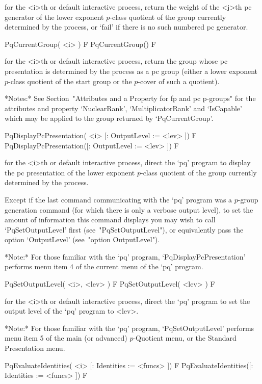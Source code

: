 for the <i>th or default interactive {\ANUPQ} process, return the  weight
of the <j>th pc generator of the lower exponent $p$-class quotient of the
group currently determined by the process, or `fail' if there is no  such
numbered pc generator.

\>PqCurrentGroup( <i> ) F
\>PqCurrentGroup() F

for the <i>th or default interactive {\ANUPQ} process, return  the  group
whose pc presentation is determined by the process as a {\GAP}  pc  group
(either a lower exponent $p$-class quotient of the  start  group  or  the
$p$-cover of such a quotient).

*Notes:*
See Section~"Attributes and a Property for fp and pc  p-groups"  for  the
attributes   and   property   `NuclearRank',   `MultiplicatorRank'    and
`IsCapable'  which  may   be   applied   to   the   group   returned   by
`PqCurrentGroup'.

\>PqDisplayPcPresentation( <i> [: OutputLevel := <lev> ]) F
\>PqDisplayPcPresentation([: OutputLevel := <lev> ]) F

for the <i>th or default interactive {\ANUPQ} process,  direct  the  `pq'
program to display the pc presentation of  the  lower  exponent  $p$-class
quotient of the group currently determined by the process.

Except if the last command communicating  with  the  `pq'  program  was  a
$p$-group generation command (for which there is only  a  verbose  output
level), to set the amount of information this command  displays  you  may
wish  to  call  `PqSetOutputLevel'  first  (see~"PqSetOutputLevel"),   or
equivalently pass the option `OutputLevel' (see~"option OutputLevel").

*Note:*
For  those  familiar  with  the  `pq'  program,  `PqDisplayPcPresentation'
performs menu item 4 of the current menu of the `pq' program.

\>PqSetOutputLevel( <i>, <lev> ) F
\>PqSetOutputLevel( <lev> ) F

for the <i>th or default interactive {\ANUPQ} process,  direct  the  `pq'
program to set the output level of the `pq' program to <lev>.

*Note:* For those  familiar  with  the  `pq'  program,  `PqSetOutputLevel'
performs menu item 5 of the main (or advanced) $p$-Quotient menu, or  the
Standard Presentation menu.

\>PqEvaluateIdentities( <i> [: Identities := <funcs> ]) F
\>PqEvaluateIdentities([: Identities := <funcs> ]) F

